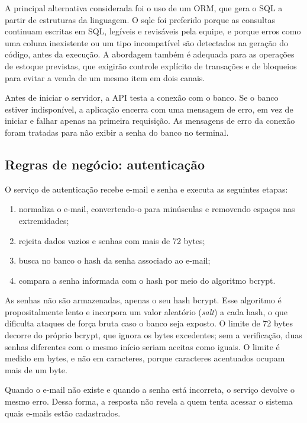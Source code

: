 A principal alternativa considerada foi o uso de um ORM, que gera o SQL a partir de estruturas da linguagem. O sqlc foi preferido porque as consultas continuam escritas em SQL, legíveis e revisáveis pela equipe, e porque erros como uma coluna inexistente ou um tipo incompatível são detectados na geração do código, antes da execução. A abordagem também é adequada para as operações de estoque previstas, que exigirão controle explícito de transações e de bloqueios para evitar a venda de um mesmo item em dois canais.

Antes de iniciar o servidor, a API testa a conexão com o banco. Se o banco estiver indisponível, a aplicação encerra com uma mensagem de erro, em vez de iniciar e falhar apenas na primeira requisição. As mensagens de erro da conexão foram tratadas para não exibir a senha do banco no terminal.

\subsection{Regras de negócio: autenticação}

O serviço de autenticação recebe e-mail e senha e executa as seguintes etapas:

\begin{enumerate}
  \item normaliza o e-mail, convertendo-o para minúsculas e removendo espaços nas extremidades;
  \item rejeita dados vazios e senhas com mais de 72 bytes;
  \item busca no banco o hash da senha associado ao e-mail;
  \item compara a senha informada com o hash por meio do algoritmo bcrypt.
\end{enumerate}

As senhas não são armazenadas, apenas o seu hash bcrypt. Esse algoritmo é propositalmente lento e incorpora um valor aleatório (\textit{salt}) a cada hash, o que dificulta ataques de força bruta caso o banco seja exposto. O limite de 72 bytes decorre do próprio bcrypt, que ignora os bytes excedentes; sem a verificação, duas senhas diferentes com o mesmo início seriam aceitas como iguais. O limite é medido em bytes, e não em caracteres, porque caracteres acentuados ocupam mais de um byte.

Quando o e-mail não existe e quando a senha está incorreta, o serviço devolve o mesmo erro. Dessa forma, a resposta não revela a quem tenta acessar o sistema quais e-mails estão cadastrados.

